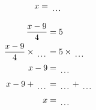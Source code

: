 \documentclass[12pt]{article}
\newcounter{minipagecount}
\begin{document}
\begin{multicols}{2}
\begin{minipage}[t]{0.45\textwidth}
\begin{align*}
        x &= \dotuline{\hspace{5mm}}\\
    \end{align*}
\end{minipage} %
\noindent{(\theminipagecount)}\hspace{0.1mm} %
\begin{minipage}[t]{0.45\textwidth} %
    \vspace{-26pt}  %
    \raggedright %
    \begin{align*} %
        \frac{x - 9}{4} &= 5\\
        \frac{x - 9}{4} \times\dotuline{\hspace{5mm}} &= 5 \times\dotuline{\hspace{5mm}}\\
        x - 9 &= \dotuline{\hspace{5mm}}\\
        x - 9 + \dotuline{\hspace{5mm}} &= \dotuline{\hspace{5mm}} + \dotuline{\hspace{5mm}}\\
        x &= \dotuline{\hspace{5mm}}\\
    \end{align*}
\end{minipage} %
\noindent{(\theminipagecount)}\hspace{0.1mm} %
\begin{minipage}[t]{0.45\textwidth} %
    \vspace{-26pt}  %

\end{minipage}
\end{multicols}
\end{document}
